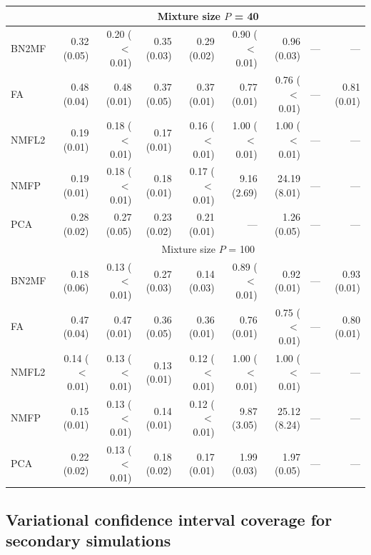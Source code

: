 \begin{landscape}
\begin{table}[!htbp]
\begin{tabular}{lrr|rr|rr|rr}
\hline 
& \multicolumn{8}{c}{Mixture size $P$ = 40} \\
\hline 
BN2MF & 0.32 (0.05) & 0.20 ($<$0.01) & 0.35 (0.03) & 0.29 (0.02) & 0.90 ($<$0.01) & 0.96 (0.03) & --- & --- \\ 
FA & 0.48 (0.04) & 0.48 (0.01) & 0.37 (0.05) & 0.37 (0.01) & 0.77 (0.01) & 0.76 ($<$0.01) & --- & 0.81 (0.01) \\ 
NMFL2 & 0.19 (0.01) & 0.18 ($<$0.01) & 0.17 (0.01) & 0.16 ($<$0.01) & 1.00 ($<$0.01) & 1.00 ($<$0.01) & --- & --- \\ 
NMFP & 0.19 (0.01) & 0.18 ($<$0.01) & 0.18 (0.01) & 0.17 ($<$0.01) & 9.16 (2.69) & 24.19 (8.01) & --- & --- \\ 
PCA & 0.28 (0.02) & 0.27 (0.05) & 0.23 (0.02) & 0.21 (0.01) & --- & 1.26 (0.05) & --- & --- \\ 
\hline 
& \multicolumn{8}{c}{Mixture size $P$ = 100} \\
\hline 
BN2MF & 0.18 (0.06) & 0.13 ($<$0.01) & 0.27 (0.03) & 0.14 (0.03) & 0.89 ($<$0.01) & 0.92 (0.01) & --- & 0.93 (0.01) \\ 
FA & 0.47 (0.04) & 0.47 (0.01) & 0.36 (0.05) & 0.36 (0.01) & 0.76 (0.01) & 0.75 ($<$0.01) & --- & 0.80 (0.01) \\ 
NMFL2 & 0.14 ($<$0.01) & 0.13 ($<$0.01) & 0.13 (0.01) & 0.12 ($<$0.01) & 1.00 ($<$0.01) & 1.00 ($<$0.01) & --- & --- \\ 
NMFP & 0.15 (0.01) & 0.13 ($<$0.01) & 0.14 (0.01) & 0.12 ($<$0.01) & 9.87 (3.05) & 25.12 (8.24) & --- & --- \\ 
PCA & 0.22 (0.02) & 0.13 ($<$0.01) & 0.18 (0.02) & 0.17 (0.01) & 1.99 (0.03) & 1.97 (0.05) & --- & --- \\ 
\hline
\hline  
\end{tabular}
\end{table}
\endgroup
\end{landscape}

\clearpage
\subsection{Variational confidence interval coverage for secondary simulations}

